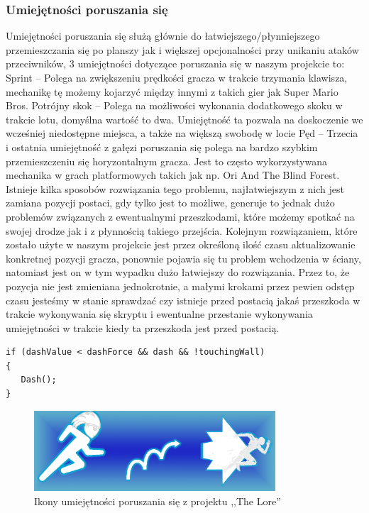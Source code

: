 \documentclass[oneside,polski,logo]{amuthesis}
\begin{document}
\subsubsection{Umiejętności poruszania się}
Umiejętności poruszania się służą głównie do łatwiejszego/płynniejszego przemieszczania się po planszy jak i większej opcjonalności przy unikaniu ataków przeciwników, 3 umiejętności dotyczące poruszania się w naszym projekcie to:
Sprint – Polega na zwiększeniu prędkości gracza w trakcie trzymania klawisza, mechanikę tę możemy kojarzyć między innymi z takich gier jak Super Mario Bros.
Potrójny skok – Polega na możliwości wykonania dodatkowego skoku w trakcie lotu, domyślna wartość to dwa. Umiejętność ta pozwala na doskoczenie we wcześniej niedostępne miejsca, a także na większą swobodę w locie
Pęd – Trzecia i ostatnia umiejętność z gałęzi poruszania się polega na bardzo szybkim przemieszczeniu się horyzontalnym gracza. Jest to często wykorzystywana mechanika w grach platformowych takich jak np. Ori And The Blind Forest. Istnieje kilka sposobów rozwiązania tego problemu, najłatwiejszym z nich jest zamiana pozycji postaci, gdy tylko jest to możliwe, generuje to jednak dużo problemów związanych z ewentualnymi przeszkodami, które możemy spotkać na swojej drodze jak i z płynnością takiego przejścia. Kolejnym rozwiązaniem, które zostało użyte w naszym projekcie jest przez określoną ilość czasu aktualizowanie konkretnej pozycji gracza, ponownie pojawia się tu problem wchodzenia w ściany, natomiast jest on w tym wypadku dużo łatwiejszy do rozwiązania. Przez to, że pozycja nie jest zmieniana jednokrotnie, a małymi krokami przez pewien odstęp czasu jesteśmy w stanie sprawdzać czy istnieje przed postacią jakaś przeszkoda w trakcie wykonywania się skryptu i ewentualne przestanie wykonywania umiejętności w trakcie kiedy ta przeszkoda jest przed postacią.

\begin{lstlisting}[breaklines=true,
language={[Sharp]C},
rulecolor=\color{blue!80!black},
caption={Fragment klasy \texttt{PlayerSkills.cs}}
]    
if (dashValue < dashForce && dash && !touchingWall)
{
   Dash();
}
\end{lstlisting}
\begin{figure}[h]
	\centering
	\includegraphics[width=9cm]{images/kozubal/movement.png}
	\caption{Ikony umiejętności poruszania się z projektu ,,The Lore''}
\end{figure}
\end{document}

